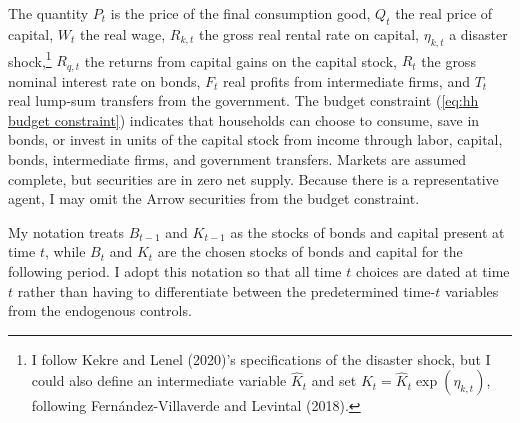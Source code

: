 \documentclass[12 pt, oneside]{article}
\theoremstyle{definition}
\theoremstyle{definition}
\theoremstyle{definition}
\begin{document}
The quantity $P_t$ is the price of the final consumption good, $Q_t$ the real price of capital, $W_t$ the real wage, $R_{k, t}$ the gross real rental rate on capital, $\eta_{k, t}$ a disaster shock,\footnote{I follow Kekre and Lenel (2020)'s specifications of the disaster shock, but I could also define an intermediate variable $\hat{K}_t$ and set $K_t = \hat{K}_t \exp(\eta_{k, t})$, following Fern{\'a}ndez-Villaverde and Levintal (2018).} $R_{q, t}$ the returns from capital gains on the capital stock, $R_t$ the gross nominal interest rate on bonds, $F_t$ real profits from intermediate firms, and $T_t$ real lump-sum transfers from the government. The budget constraint (\ref{eq:hh budget constraint}) indicates that households can choose to consume, save in bonds, or invest in units of the capital stock from income through labor, capital, bonds, intermediate firms, and government transfers. Markets are assumed complete, but securities are in zero net supply. Because there is a representative agent, I may omit the Arrow securities from the budget constraint.

My notation treats $B_{t - 1}$ and $K_{t - 1}$ as the stocks of bonds and capital present at time $t$, while $B_t$ and $K_t$ are the chosen stocks of bonds and capital for the following period. I adopt this notation so that all time $t$ choices are dated at time $t$ rather than having to differentiate between the predetermined time-$t$ variables from the endogenous controls.
\end{document}
